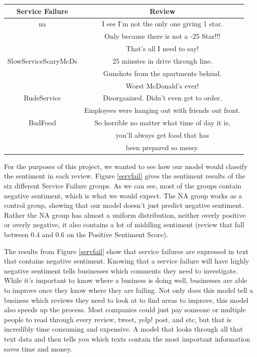 \documentclass[titlepage,letterpaper]{article}
\begin{document}
 \begin{center}
	\centering
	\begin{tabular}{ |c|c| } 
		\hline
		Service Failure & Review \\
		\hline \hline
		na & I see I'm not the only one giving 1 star. \\
		 & Only because there is not a -25 Star!!! \\
		  & That's all I need to say! \\
		\hline
		SlowServiceScaryMcDs &  25 minutes in drive through line. \\
		& Gunshots from the apartments behind. \\
		& Worst McDonald's ever! \\
		\hline
		RudeService & Disorganized. Didn't even get to order. \\
		& Employees were hanging out with friends out front.  \\ 
		\hline
		BadFood & So horrible no matter what time of day it is, \\
		& you'll always get food that has \\ 
		& been prepared so messy. \\
		\hline
	\end{tabular}
	\label{McdonaldsServiceFailureTable}
\end{center}

For the purposes of this project, we wanted to see how our model would classify the sentiment in each review. Figure \ref{servfail} gives the sentiment results of the six different Service Failure groups. As we can see, most of the groups contain negative sentiment, which is what we would expect. The NA group works as a control group, showing that our model doesn't just predict negative sentiment. Rather the NA group has almost a uniform distribution, neither overly positive or overly negative, it also contains a lot of middling sentiment (review that fall between $0.4$ and $0.6$ on the Positive Sentiment Score).

The results from Figure \ref{servfail} show that service failures are expressed in text that contains negative sentiment. Knowing that a service failure will have highly negative sentiment tells businesses which comments they need to investigate. While it's important to know where a business is doing well, businesses are able to improve once they know where they are failing. Not only does this model tell a business which reviews they need to look at to find areas to improve, this model also speeds up the process. Most companies could just pay someone or multiple people to read through every review, tweet, yelp! post, and etc, but that is incredibly time consuming and expensive. A model that looks through all that text data and then tells you which texts contain the most important information saves time and money.  
\end{document}
